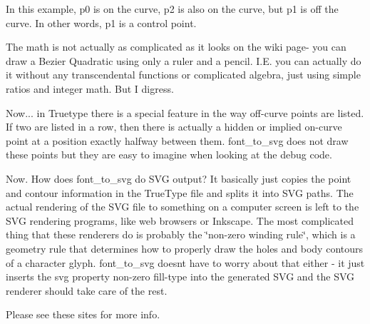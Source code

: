 In this example, p0 is \textquotesingle{}on the curve\textquotesingle{}, p2 is also \textquotesingle{}on the curve\textquotesingle{}, but p1 is \textquotesingle{}off the curve\textquotesingle{}. In other words, p1 is a \textquotesingle{}control point\textquotesingle{}.



The math is not actually as complicated as it looks on the wiki page-\/ you can draw a Bezier Quadratic using only a ruler and a pencil. I.\+E. you can actually do it without any transcendental functions or complicated algebra, just using simple ratios and integer math. But I digress.

Now... in Truetype there is a special feature in the way off-\/curve points are listed. If two are listed in a row, then there is actually a \textquotesingle{}hidden\textquotesingle{} or \textquotesingle{}implied\textquotesingle{} on-\/curve point at a position exactly halfway between them. font\+\_\+to\+\_\+svg does not draw these points but they are easy to imagine when looking at the debug code.

Now. How does font\+\_\+to\+\_\+svg do S\+VG output? It basically just copies the point and contour information in the True\+Type file and splits it into S\+VG paths. The actual rendering of the S\+VG file to something on a computer screen is left to the S\+VG rendering programs, like web browsers or Inkscape. The most complicated thing that these renderers do is probably the \char`\"{}non-\/zero winding rule\char`\"{}, which is a geometry rule that determines how to properly draw the \textquotesingle{}holes\textquotesingle{} and \textquotesingle{}body\textquotesingle{} contours of a character glyph. font\+\_\+to\+\_\+svg doesn\textquotesingle{}t have to worry about that either -\/ it just inserts the svg property \textquotesingle{}non-\/zero\textquotesingle{} fill-\/type into the generated S\+VG and the S\+VG renderer should take care of the rest.

Please see these sites for more info.


